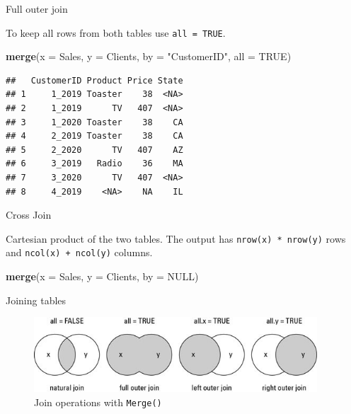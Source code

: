 \documentclass[ignorenonframetext,]{beamer}
\newenvironment{Shaded}{\begin{snugshade}}{\end{snugshade}}
\newcommand{\DataTypeTok}[1]{\textcolor[rgb]{0.13,0.29,0.53}{#1}}
\newcommand{\KeywordTok}[1]{\textcolor[rgb]{0.13,0.29,0.53}{\textbf{#1}}}
\newcommand{\NormalTok}[1]{#1}
\newcommand{\OtherTok}[1]{\textcolor[rgb]{0.56,0.35,0.01}{#1}}
\newcommand{\StringTok}[1]{\textcolor[rgb]{0.31,0.60,0.02}{#1}}
\begin{document}
\begin{frame}[fragile]{Full outer join}
\protect\hypertarget{full-outer-join}{}

To keep all rows from both tables use \texttt{all\ =\ TRUE}.

\begin{Shaded}
\begin{Highlighting}[]
\KeywordTok{merge}\NormalTok{(}\DataTypeTok{x =}\NormalTok{ Sales, }\DataTypeTok{y =}\NormalTok{ Clients,}
  \DataTypeTok{by =} \StringTok{"CustomerID"}\NormalTok{, }
  \DataTypeTok{all =} \OtherTok{TRUE}\NormalTok{) }
\end{Highlighting}
\end{Shaded}

\begin{verbatim}
##   CustomerID Product Price State
## 1     1_2019 Toaster    38  <NA>
## 2     1_2019      TV   407  <NA>
## 3     1_2020 Toaster    38    CA
## 4     2_2019 Toaster    38    CA
## 5     2_2020      TV   407    AZ
## 6     3_2019   Radio    36    MA
## 7     3_2020      TV   407  <NA>
## 8     4_2019    <NA>    NA    IL
\end{verbatim}

\end{frame}

\begin{frame}[fragile]{Cross Join}
\protect\hypertarget{cross-join}{}

Cartesian product of the two tables. The output has
\texttt{nrow(x)\ *\ nrow(y)} rows and \texttt{ncol(x)\ +\ ncol(y)}
columns.

\begin{Shaded}
\begin{Highlighting}[]
\KeywordTok{merge}\NormalTok{(}\DataTypeTok{x =}\NormalTok{ Sales, }\DataTypeTok{y =}\NormalTok{ Clients, }
      \DataTypeTok{by =} \OtherTok{NULL}\NormalTok{)}
\end{Highlighting}
\end{Shaded}

\end{frame}

\begin{frame}[fragile]{Joining tables}
\protect\hypertarget{joining-tables-1}{}

\begin{figure}
\centering
\includegraphics[width=4.16667in,height=\textheight]{figures/joins.jpg}
\caption{Join operations with \texttt{Merge()}}
\end{figure}

\end{frame}
\end{document}
